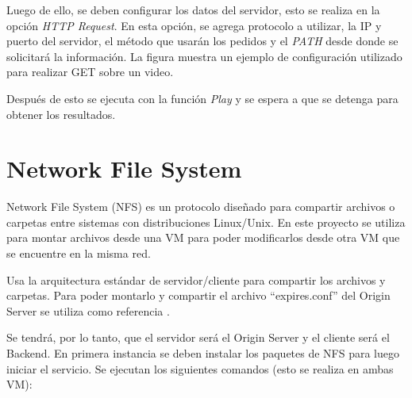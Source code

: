 \documentclass[12pt,a4paper,oneside]{book}
\begin{document}
\vspace{0.5cm}


\vspace{0.5cm}

Luego de ello, se deben configurar los datos del servidor, esto se realiza en la opción \textit{HTTP Request}. En esta opción, se agrega protocolo a utilizar, la IP y puerto del servidor, el método que usarán los pedidos y el \textit{PATH} desde donde se solicitará la información. La figura  muestra un ejemplo de configuración utilizado para realizar GET sobre un video.

\vspace{0.5cm}

Después de esto se ejecuta con la función \textit{Play} y se espera a que se detenga para obtener los resultados.

\vspace{0.5cm}



\section{Network File System}
\label{seccA.2}

Network File System (NFS) es un protocolo diseñado para compartir archivos o carpetas entre sistemas con distribuciones Linux/Unix. En este proyecto se utiliza para montar archivos desde una VM para poder modificarlos desde otra VM que se encuentre en la misma red.

\vspace{0.5cm}

Usa la arquitectura estándar de servidor/cliente para compartir los archivos y carpetas. Para poder montarlo y compartir el archivo ``expires.conf'' del Origin Server se utiliza como referencia \cite{tecmint_NFS}.

\vspace{0.5cm}

Se tendrá, por lo tanto, que el servidor será el Origin Server y el cliente será el Backend.
En primera instancia se deben instalar los paquetes de NFS para luego iniciar el servicio. Se ejecutan los siguientes comandos (esto se realiza en ambas VM):
\end{document}
